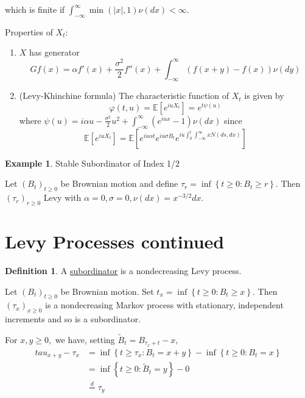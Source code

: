 \documentclass{article}
\newcommand{\E}{\mathbb{E}}    %
\theoremstyle{definition}
\newtheorem{defn}[thm]{Definition}
\newtheorem{exmp}[thm]{Example}
\begin{document}
	which is finite if $\int _{-\infty}^{\infty} \min( |x|, 1 ) \nu(dx) < \infty.$
	
	Properties of $X_t:$
	
	\begin{enumerate}
		\item $X$ has generator
		\begin{equation}
		Gf(x)=\alpha f'(x) + \frac{\sigma^2}{2} f''(x) + \int_{-\infty}^{\infty} \left( f(x+y) - f(x) \right) \nu(dy)
		\end{equation}
		
		\item (Levy-Khinchine formula)
		The characteristic function of $X_t$ is given by
		\begin{equation}
		\varphi(t, u)
		= \E \left[ e^{i u X_t} \right]
		= e^{t\psi(u)}
		\end{equation}
		where $\psi(u)=i \alpha u - \frac{\sigma^2}{2} u^2 + \int_{-\infty}^{\infty} \left( e^{i u x} - 1 \right) \nu(dx)$
		since
		\begin{equation}
		\E \left[ e^{i u X_t} \right] 
		= \E \left[ e^{i u \alpha t} e^{i u \sigma B_t} e^{i u \int_{0}^{t} \int_{-\infty}^{\infty} x N(ds, dx) } \right]
		\end{equation}
	\end{enumerate}
	
	\begin{exmp}Stable Subordinator of Index 1/2
	
	Let $(B_t)_{t \geq 0}$ be Brownian motion and define
	$\tau_r = \inf \left\lbrace t \geq 0 : B_t \geq r \right\rbrace.$
	Then $(\tau_r)_{r \geq 0 }$ Levy with
	$
	\alpha=0,
	\sigma=0,
	\nu(dx)=x^{-3/2}dx.
	$
	\end{exmp}
	
	\section{Levy Processes continued}
	
	\begin{defn}
		A \underline{subordinator} is a nondecreasing Levy process.
	\end{defn}
	
	Let $(B_t)_{t \geq 0}$ be Brownian motion.
	Set $t_x = \inf \left\lbrace t \geq 0 : B_t \geq x \right\rbrace.$ 
	Then $(\tau_x)_{x \geq 0}$ is a nondecreasing Markov process with stationary, independent increments
	and so is a subordinator.
	
	For $x,y \geq 0,$ we have, setting $\tilde{B}_t = B_{\tau_x + t} - x,$
	$$
	\begin{aligned}
	tau_{x + y} - \tau_x 
	& = \inf \left\lbrace t \geq \tau_x : B_t = x + y \right\rbrace 
	  - \inf \left\lbrace t \geq 0 : B_t = x \right\rbrace \\
	& = \inf \left\lbrace t \geq 0 : \tilde{B}_t = y \right\rbrace
	  - 0 \\
	& \stackrel{d}{=} \tau_y
	\end{aligned}
	$$
	
\end{document}
